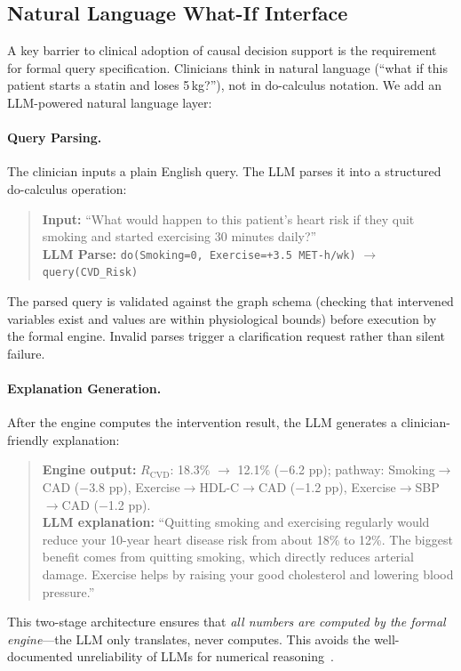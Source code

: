 \documentclass[runningheads]{llncs}
\begin{document}
\subsection{Natural Language What-If Interface}\label{sec:llminterface}

A key barrier to clinical adoption of causal decision support is
the requirement for formal query specification.
Clinicians think in natural language (``what if this patient starts
a statin and loses 5\,kg?''), not in do-calculus notation.
We add an LLM-powered natural language layer:

\paragraph{Query Parsing.}
The clinician inputs a plain English query. The LLM parses it into
a structured do-calculus operation:
\begin{quote}
\small
\textbf{Input:} ``What would happen to this patient's heart risk
if they quit smoking and started exercising 30 minutes daily?''\\
\textbf{LLM Parse:} \texttt{do(Smoking=0, Exercise=+3.5 MET-h/wk)}
$\to$ \texttt{query(CVD\_Risk)}
\end{quote}
The parsed query is validated against the graph schema (checking
that intervened variables exist and values are within physiological
bounds) before execution by the formal engine.
Invalid parses trigger a clarification request rather than
silent failure.

\paragraph{Explanation Generation.}
After the engine computes the intervention result, the LLM
generates a clinician-friendly explanation:
\begin{quote}
\small
\textbf{Engine output:} $R_{\text{CVD}}$: 18.3\% $\to$ 12.1\%
($-$6.2 pp); pathway: Smoking$\to$CAD ($-$3.8 pp),
Exercise$\to$HDL-C$\to$CAD ($-$1.2 pp),
Exercise$\to$SBP$\to$CAD ($-$1.2 pp).\\
\textbf{LLM explanation:} ``Quitting smoking and exercising
regularly would reduce your 10-year heart disease risk from
about 18\% to 12\%. The biggest benefit comes from quitting
smoking, which directly reduces arterial damage. Exercise
helps by raising your good cholesterol and lowering blood
pressure.''
\end{quote}

This two-stage architecture ensures that \emph{all numbers are
computed by the formal engine}---the LLM only translates, never
computes.
This avoids the well-documented unreliability of LLMs for
numerical reasoning~\cite{jin2023cladder}.
\end{document}

